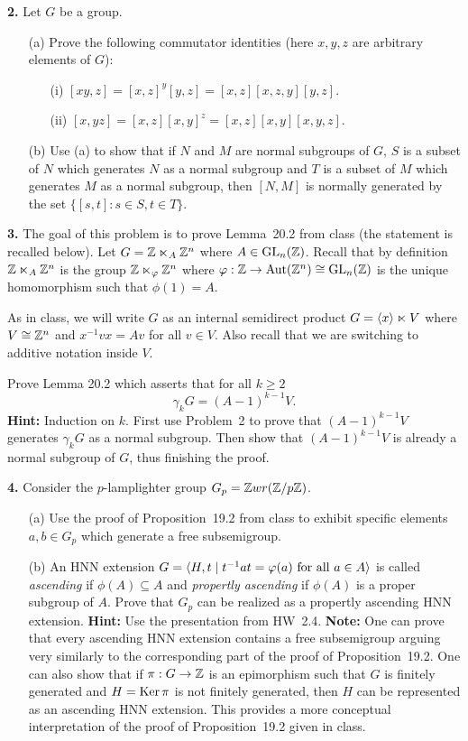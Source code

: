 \documentclass[12pt]{amsart}
\begin{document}
\skv
{\bf 2.} Let $G$ be a group.
\begin{itemize}
\item[(a)] Prove the following commutator identities 
(here $x,y,z$ are arbitrary elements of $G$):
\begin{itemize}
\item[(i)] $[xy,z] = [x,z]^y [y,z]=[x,z][x,z,y][y,z]$.
\item[(ii)] $[x,yz] = [x,z] [x,y]^z=[x,z][x,y][x,y,z]$.
\end{itemize}
\item[(b)] Use (a) to show that if $N$ and $M$ are normal
subgroups of $G$, $S$ is a subset of $N$ which generates
$N$ as a normal subgroup and $T$ is a subset of $M$ which generates
$M$ as a normal subgroup, then $[N,M]$
is normally generated by the set $\{[s,t]: s\in S, t\in T\}$.
\end{itemize}
\skv

{\bf 3.} The goal of this problem is to prove Lemma~20.2 from class
(the statement is recalled below). Let $G={\mathbb Z}\ltimes_A {\mathbb Z}^n$
where $A\in {\rm GL}_n({\mathbb Z})$. Recall that by definition
${\mathbb Z}\ltimes_A {\mathbb Z}^n$ is the group ${\mathbb Z}\ltimes_{{\varphi}} {\mathbb Z}^n$
where ${\varphi}:{\mathbb Z}\to{\rm Aut}({\mathbb Z}^n)\cong{\rm GL}_n({\mathbb Z})$ is the unique homomorphism such that $\phi(1)=A$.

As in class, we will write $G$ as an internal semidirect product
$G={\langle} x{\rangle}\ltimes V$ where $V\cong{\mathbb Z}^n$ and $x^{-1}vx=Av$
for all $v\in V$. Also recall that we are switching to additive
notation inside $V$.

Prove Lemma 20.2 which asserts that for all $k\geq 2$ $$\gamma_k G=(A-1)^{k-1}V.$$
{\bf Hint:} Induction on $k$. First use Problem~2 to prove that
$(A-1)^{k-1}V$ generates $\gamma_k G$ as a normal subgroup. Then
show that $(A-1)^{k-1}V$ is already a normal subgroup of $G$,
thus finishing the proof.
\skv

{\bf 4.} Consider the $p$-lamplighter group $G_p={\mathbb Z} wr ({\mathbb Z}/p{\mathbb Z})$.
\begin{itemize}
\item[(a)] Use the proof of Proposition~19.2 from class to exhibit specific elements $a,b\in G_p$ which generate a free subsemigroup.
\item[(b)] An HNN extension 
$G={\langle} H,t \mid t^{-1}at={\varphi}(a) \mbox{ for all }a\in A {\rangle}$
is called {\it ascending} if $\phi(A)\subseteq A$ and 
{\it propertly ascending} if $\phi(A)$ is a proper subgroup of $A$.
Prove that $G_p$ can be realized as a propertly ascending HNN extension.
{\bf Hint:} Use the presentation from HW~2.4.
\skv
{\bf Note:} One can prove that every ascending HNN extension contains a free subsemigroup
arguing very similarly to the corresponding part of the proof of Proposition~19.2. One can also
show that if $\pi:G\to{\mathbb Z}$ is an epimorphism such that $G$ is finitely generated and
$H={\rm Ker\,}\pi$ is not finitely generated, then $H$ can be represented as an ascending HNN extension.
This provides a more conceptual interpretation of the proof of Proposition~19.2 given in class.
\end{itemize}
\end{document}
